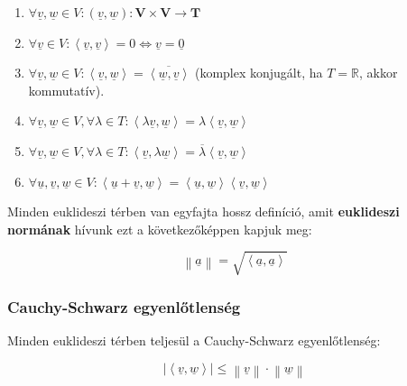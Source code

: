 \documentclass{article}
\begin{document}
\begin{enumerate}
    \item $\forall \underline{v}, \underline{w} \in V: (\underline{v}, \underline{w}) : \mathbf{V \times V \rightarrow T}$
    \item  $\forall \underline{v} \in V:  \left\langle \underline{v}, \underline{v} \right\rangle = 0 \Leftrightarrow \underline{v} = \underline{0}$
    \item $\forall \underline{v}, \underline{w} \in V: \left\langle \underline{v}, \underline{w} \right\rangle = \overline{\left\langle \underline{w}, \underline{v} \right\rangle}$ (komplex konjugált, ha $T = \mathbb{R}$, akkor kommutatív).
    \item $\forall \underline{v}, \underline{w} \in V,\forall \lambda \in T: \left\langle \lambda \underline{v}, \underline{w} \right\rangle =\lambda \left\langle  \underline{v}, \underline{w} \right\rangle $
    \item $\forall \underline{v}, \underline{w} \in V,\forall \lambda \in T: \left\langle \underline{v}, \lambda \underline{w} \right\rangle = \overline{\lambda} \left\langle  \underline{v}, \underline{w} \right\rangle $
    \item $\forall \underline{u}, \underline{v}, \underline{w} \in V: \left\langle \underline{u} + \underline{v}, \underline{w} \right\rangle = \left\langle \underline{u}, \underline{w} \right\rangle \left\langle \underline{v}, \underline{w} \right\rangle$
\end{enumerate}     

Minden euklideszi térben van egyfajta hossz definíció, amit \textbf{e\-uk\-lid\-eszi nor\-má\-nak} hí\-vunk ezt a következőképpen kapjuk meg:

\begin{equation*}
    \left\lVert \underline{a} \right\rVert = \sqrt{\left\langle \underline{a},\underline{a} \right\rangle } 
\end{equation*}

\subsubsection{Cauchy-Schwarz egyenlőtlenség}

Minden euklideszi térben teljesül a Cauchy-Schwarz egyenlőtlenség:

\begin{equation*}
    \left\lvert \left\langle \underline{v}, \underline{w} \right\rangle \right\rvert \leq \left\lVert \underline{v} \right\rVert \cdot \left\lVert \underline{w} \right\rVert
\end{equation*}
\end{document}
